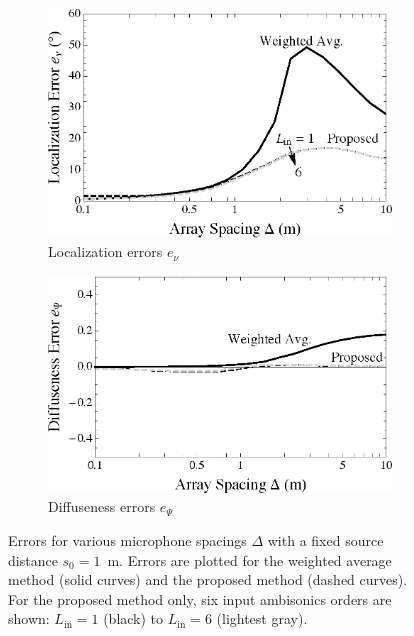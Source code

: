 \begin{figure}[t]
	\vspace{0.5cm}
	\begin{subfigure}[b]{0.49\textwidth}
        		\includegraphics[width=\textwidth]{08_proposed_method/figures/tylka2017_order.eps}
        		\caption{Localization errors $e_\nu$}
		\label{fig:08_Proposed_Method:Localization_Errors:Order}
    	\end{subfigure}
	\hfill
    	\begin{subfigure}[b]{0.49\textwidth}
        		\includegraphics[width=\textwidth]{08_proposed_method/figures/merimaa2005_d_order.eps}
        		\caption{Diffuseness errors $e_\Psi$}
		\label{fig:08_Proposed_Method:Diffuseness_Errors:Order}
    	\end{subfigure}
	
    	\caption[Order dependence plots for each interpolation method.]{
	Errors for various microphone spacings $\Delta$ with a fixed source distance $s_0 = 1$~m.
	Errors are plotted for the weighted average method (solid curves) and the proposed method (dashed curves).
	For the proposed method only, six input ambisonics orders are shown: $L_\textrm{in} = 1$ (black) to $L_\textrm{in} = 6$ (lightest gray).}
    	\label{fig:08_Proposed_Method:Order_Errors}
\end{figure}

